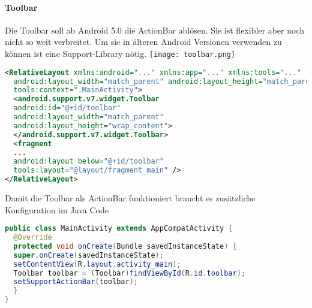 \paragraph{Toolbar} Die Toolbar soll ab Android 5.0 die ActionBar ablösen. Sie ist flexibler aber noch nicht so weit verbreitet. Um sie in älteren Android Versionen verwenden zu können ist eine Support-Library nötig.
\texttt{[image: toolbar.png]}
\begin{lstlisting}[language=xml]
<RelativeLayout xmlns:android="..." xmlns:app="..." xmlns:tools="..."
  android:layout_width="match_parent" android:layout_height="match_parent"
  tools:context=".MainActivity">
  <android.support.v7.widget.Toolbar
  android:id="@+id/toolbar"
  android:layout_width="match_parent"
  android:layout_height="wrap_content">
  </android.support.v7.widget.Toolbar>
  <fragment
  ...
  android:layout_below="@+id/toolbar"
  tools:layout="@layout/fragment_main" />
</RelativeLayout>
\end{lstlisting}
Damit die Toolbar als ActionBar funktioniert braucht es zusätzliche Konfiguration im Java Code
\begin{lstlisting}[language=java]
public class MainActivity extends AppCompatActivity {
  @Override
  protected void onCreate(Bundle savedInstanceState) {
  super.onCreate(savedInstanceState);
  setContentView(R.layout.activity_main);
  Toolbar toolbar = (Toolbar)findViewById(R.id.toolbar);
  setSupportActionBar(toolbar);
  }
}
\end{lstlisting}
